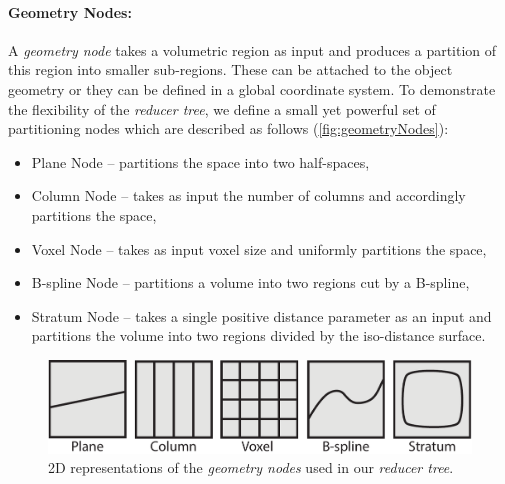 \paragraph{Geometry Nodes:}A \emph{geometry node} takes a volumetric region as input and produces a partition of this region into smaller sub-regions. 
These can be attached to the object geometry or they can be defined in a global coordinate system.
To demonstrate the flexibility of the \emph{reducer tree}, we define a small yet powerful set of partitioning nodes which are described as follows %
 (\autoref{fig:geometryNodes}):\vspace{-0.25\baselineskip}
\begin{itemize}
\item Plane Node --  partitions the space into two half-spaces, \vspace{-0.25\baselineskip}
\item Column Node -- takes as input the number of columns and accordingly partitions the space,\vspace{-0.25\baselineskip}
\item Voxel Node -- takes as input voxel size and uniformly partitions the space,\vspace{-0.25\baselineskip}
\item B-spline Node -- partitions a volume into two regions cut by a B-spline,\vspace{-0.25\baselineskip}
\item Stratum Node -- takes a single positive distance parameter as an input and partitions the volume into two regions divided by the iso-distance surface.\vspace{-0.25\baselineskip}
\end{itemize} 

\begin{figure}[h]
\centering
\includegraphics[width=0.7\linewidth]{figure/geometryNodes}
\caption{2D representations  of the \emph{geometry nodes} used in our \emph{reducer tree}.}
\label{fig:geometryNodes}
\end{figure}

